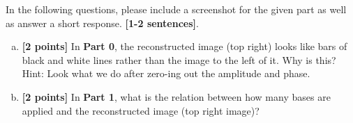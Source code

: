 \documentclass[11pt]{article}
\begin{document}
\begin{tcolorbox}[colback=orange!5!white,colframe=orange!75!black]
In the following questions, please include a screenshot for the given part as well as answer a short response. \textbf{[1-2 sentences]}.
\end{tcolorbox} 

\begin{enumerate}[(a)]
\item \textbf{[2 points]}
In \textbf{Part 0}, the reconstructed image (top right) looks like bars of black and white lines rather than the image to the left of it. Why is this? Hint: Look what we do after zero-ing out the amplitude and phase.


\item \textbf{[2 points]}
In \textbf{Part 1}, what is the relation between how many bases are applied and the reconstructed image (top right image)?


\end{enumerate}
\end{document}
